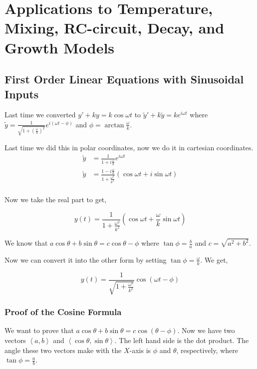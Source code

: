 

\chapter{Applications to Temperature, Mixing, RC-circuit, Decay, and Growth Models} 

\bigbreak

\section{First Order Linear Equations with Sinusoidal Inputs}

Last time we converted $y' + ky = k \cos \omega t$
to $\tilde{y}' + k\tilde{y} = k e^{i \omega t}$
where $\tilde{y} = \frac{1}{\sqrt{1 + \left( \frac{\omega}{k} \right)^2}} e^{i(\omega t - \phi)}$
and $\phi = \arctan \frac{\omega}{k}$.


Last time we did this in polar coordinates, now we do it in cartesian coordinates.
\begin{align*}
    \tilde{y} & = \frac{1}{1 + i \frac{\omega}{k}} e^{i \omega t} \\
    \tilde{y} & = \frac{1 - i \frac{\omega}{k}}{1 + \frac{\omega^2}{k^2}} (\cos \omega t + i \sin \omega t) \\
\end{align*}

Now we take the real part to get, 

$$ y(t) = \frac{1}{1 + \frac{\omega^2}{k^2}} \left( \cos \omega t + \frac{\omega}{k} \sin \omega t \right) $$

We know that $a \cos \theta + b \sin \theta = c \cos \theta - \phi$ where $\tan \phi = \frac{b}{a}$ and $c = \sqrt{a^2 + b^2}$.

Now we can convert it into the other form by setting $\tan \phi = \frac{\omega}{k}$.
We get, 

$$ y(t) = \frac{1}{\sqrt{1 + \frac{\omega^2}{k^2}}} \cos(\omega t - \phi) $$


\subsection{Proof of the Cosine Formula}

We want to prove that $a\cos \theta + b\sin \theta = c \cos (\theta - \phi)$.
Now we have two vectors $\left< a, b \right>$ and $\left< \cos \theta, \sin \theta \right>$.
The left hand side is the dot product.
The angle these two vectors make with the $X$-axis is $\phi$ and $\theta$, respectively, where $\tan \phi = \frac{a}{b}$.

